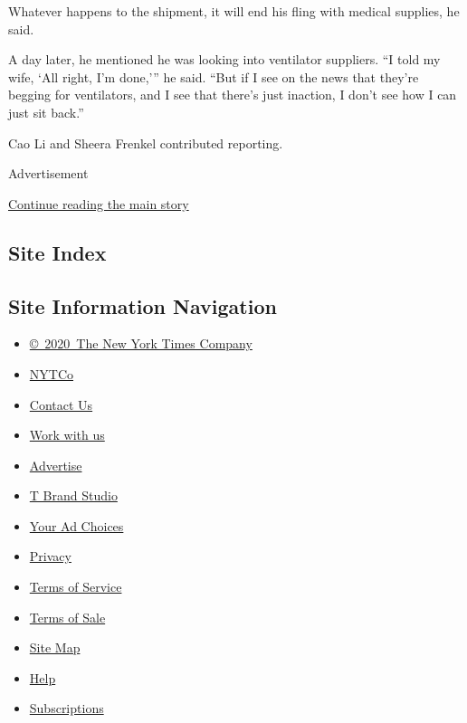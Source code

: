 Whatever happens to the shipment, it will end his fling with medical
supplies, he said.

A day later, he mentioned he was looking into ventilator suppliers. ``I
told my wife, `All right, I'm done,''' he said. ``But if I see on the
news that they're begging for ventilators, and I see that there's just
inaction, I don't see how I can just sit back.''

Cao Li and Sheera Frenkel contributed reporting.

Advertisement

\protect\hyperlink{after-bottom}{Continue reading the main story}

\hypertarget{site-index}{%
\subsection{Site Index}\label{site-index}}

\hypertarget{site-information-navigation}{%
\subsection{Site Information
Navigation}\label{site-information-navigation}}

\begin{itemize}
\tightlist
\item
  \href{https://help.nytimes3xbfgragh.onion/hc/en-us/articles/115014792127-Copyright-notice}{©~2020~The
  New York Times Company}
\end{itemize}

\begin{itemize}
\tightlist
\item
  \href{https://www.nytco.com/}{NYTCo}
\item
  \href{https://help.nytimes3xbfgragh.onion/hc/en-us/articles/115015385887-Contact-Us}{Contact
  Us}
\item
  \href{https://www.nytco.com/careers/}{Work with us}
\item
  \href{https://nytmediakit.com/}{Advertise}
\item
  \href{http://www.tbrandstudio.com/}{T Brand Studio}
\item
  \href{https://www.nytimes3xbfgragh.onion/privacy/cookie-policy\#how-do-i-manage-trackers}{Your
  Ad Choices}
\item
  \href{https://www.nytimes3xbfgragh.onion/privacy}{Privacy}
\item
  \href{https://help.nytimes3xbfgragh.onion/hc/en-us/articles/115014893428-Terms-of-service}{Terms
  of Service}
\item
  \href{https://help.nytimes3xbfgragh.onion/hc/en-us/articles/115014893968-Terms-of-sale}{Terms
  of Sale}
\item
  \href{https://spiderbites.nytimes3xbfgragh.onion}{Site Map}
\item
  \href{https://help.nytimes3xbfgragh.onion/hc/en-us}{Help}
\item
  \href{https://www.nytimes3xbfgragh.onion/subscription?campaignId=37WXW}{Subscriptions}
\end{itemize}
